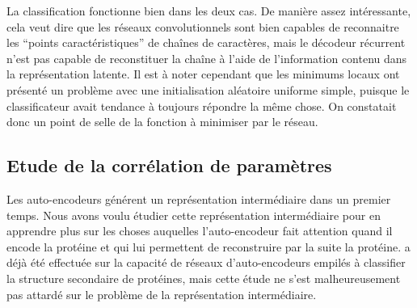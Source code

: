 \documentclass[a4paper, 11pt, onecolumn]{article}
\begin{document}
La classification fonctionne bien dans les deux cas. De manière assez
intéressante, cela veut dire que les réseaux convolutionnels sont bien capables
de reconnaitre les ``points caractéristiques'' de chaînes de caractères, mais le
décodeur récurrent n'est pas capable de reconstituer la chaîne à l'aide de
l'information contenu dans la représentation latente. Il est à noter cependant
que les minimums locaux ont présenté un problème avec une initialisation
aléatoire uniforme simple, puisque le classificateur avait tendance à toujours
répondre la même chose. On constatait donc un point de selle de la fonction à
minimiser par le réseau.





\subsection{Etude de la corrélation de paramètres}

Les auto-encodeurs générent un représentation intermédiaire dans un premier
temps. Nous avons voulu étudier cette représentation intermédiaire pour en
apprendre plus sur les choses auquelles l'auto-encodeur fait attention quand il
encode la protéine et qui lui permettent de reconstruire par la suite la
protéine. \cite{jian2013predicting} a déjà été effectuée sur la capacité de réseaux d'auto-encodeurs
empilés à classifier la structure secondaire de protéines, mais cette étude ne
s'est malheureusement pas attardé sur le problème de la représentation
intermédiaire.
\end{document}
